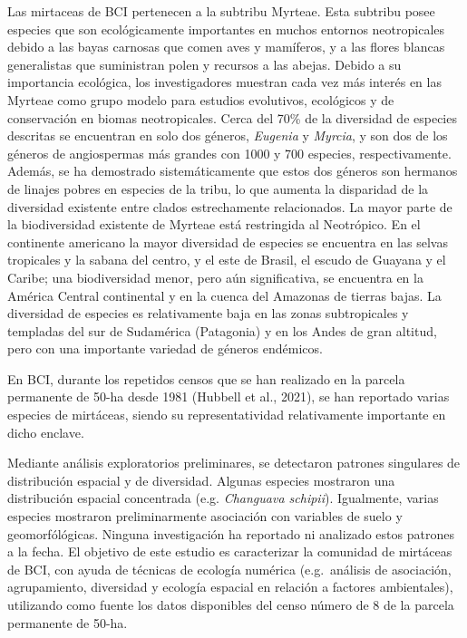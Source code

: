 \documentclass[11pt,]{article}
\begin{document}
Las mirtaceas de BCI pertenecen a la subtribu Myrteae. Esta subtribu
posee especies que son ecológicamente importantes en muchos entornos
neotropicales debido a las bayas carnosas que comen aves y mamíferos, y
a las flores blancas generalistas que suministran polen y recursos a las
abejas. Debido a su importancia ecológica, los investigadores muestran
cada vez más interés en las Myrteae como grupo modelo para estudios
evolutivos, ecológicos y de conservación en biomas neotropicales. Cerca
del 70\% de la diversidad de especies descritas se encuentran en solo
dos géneros, \emph{Eugenia} y \emph{Myrcia}, y son dos de los géneros de
angiospermas más grandes con 1000 y 700 especies, respectivamente.
Además, se ha demostrado sistemáticamente que estos dos géneros son
hermanos de linajes pobres en especies de la tribu, lo que aumenta la
disparidad de la diversidad existente entre clados estrechamente
relacionados. La mayor parte de la biodiversidad existente de Myrteae
está restringida al Neotrópico. En el continente americano la mayor
diversidad de especies se encuentra en las selvas tropicales y la sabana
del centro, y el este de Brasil, el escudo de Guayana y el Caribe; una
biodiversidad menor, pero aún significativa, se encuentra en la América
Central continental y en la cuenca del Amazonas de tierras bajas. La
diversidad de especies es relativamente baja en las zonas subtropicales
y templadas del sur de Sudamérica (Patagonia) y en los Andes de gran
altitud, pero con una importante variedad de géneros endémicos.

En BCI, durante los repetidos censos que se han realizado en la parcela
permanente de 50-ha desde 1981 (Hubbell et al., 2021), se han reportado
varias especies de mirtáceas, siendo su representatividad relativamente
importante en dicho enclave.

Mediante análisis exploratorios preliminares, se detectaron patrones
singulares de distribución espacial y de diversidad. Algunas especies
mostraron una distribución espacial concentrada (e.g. \emph{Changuava
schipii}). Igualmente, varias especies mostraron preliminarmente
asociación con variables de suelo y geomorfólógicas. Ninguna
investigación ha reportado ni analizado estos patrones a la fecha. El
objetivo de este estudio es caracterizar la comunidad de mirtáceas de
BCI, con ayuda de técnicas de ecología numérica (e.g.~análisis de
asociación, agrupamiento, diversidad y ecología espacial en relación a
factores ambientales), utilizando como fuente los datos disponibles del
censo número de 8 de la parcela permanente de 50-ha.
\end{document}

